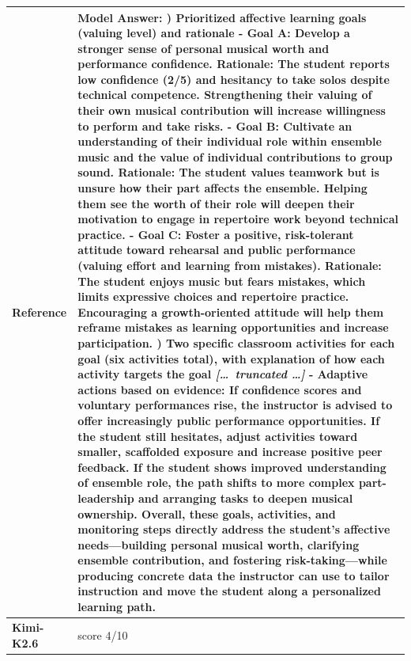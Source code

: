 \begin{longtable}{@{}l p{12.5cm}@{}}
  \textbf{Reference} & Model Answer: \newline 1) Prioritized affective learning goals (valuing level) and rationale \newline - Goal A: Develop a stronger sense of personal musical worth and performance confidence. Rationale: The student reports low confidence (2/5) and hesitancy to take solos despite technical competence. Strengthening their valuing of their own musical contribution will increase willingness to perform and take risks. \newline - Goal B: Cultivate an understanding of their individual role within ensemble music and the value of individual contributions to group sound. Rationale: The student values teamwork but is unsure how their part affects the ensemble. Helping them see the worth of their role will deepen their motivation to engage in repertoire work beyond technical practice. \newline - Goal C: Foster a positive, risk-tolerant attitude toward rehearsal and public performance (valuing effort and learning from mistakes). Rationale: The student enjoys music but fears mistakes, which limits expressive choices and repertoire practice. Encouraging a growth-oriented attitude will help them reframe mistakes as learning opportunities and increase participation. \newline 2) Two specific classroom activities for each goal (six activities total), with explanation of how each activity targets the goal \newline \textit{[\ldots\ truncated \ldots]} \newline - Adaptive actions based on evidence: If confidence scores and voluntary performances rise, the instructor is advised to offer increasingly public performance opportunities. If the student still hesitates, adjust activities toward smaller, scaffolded exposure and increase positive peer feedback. If the student shows improved understanding of ensemble role, the path shifts to more complex part-leadership and arranging tasks to deepen musical ownership. \newline Overall, these goals, activities, and monitoring steps directly address the student's affective needs---building personal musical worth, clarifying ensemble contribution, and fostering risk-taking---while producing concrete data the instructor can use to tailor instruction and move the student along a personalized learning path. \\
  \midrule
  \textbf{Kimi-K2.6} & score 4/10 \\

\end{longtable}
